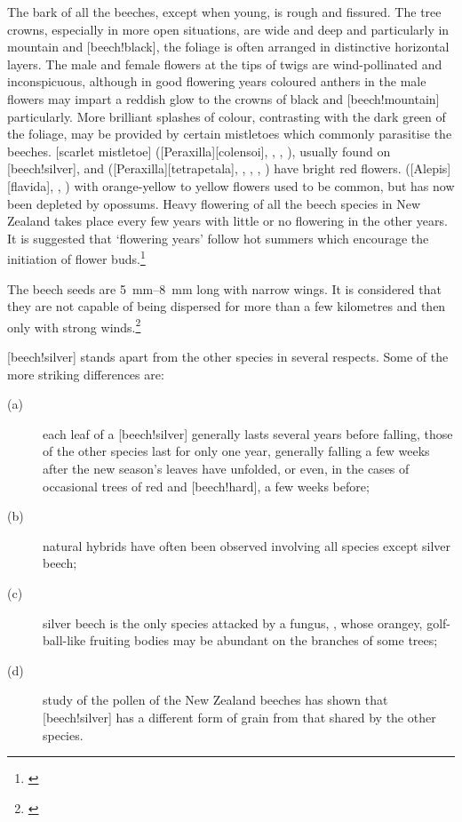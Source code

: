 The bark of all the beeches, except when young, is rough and fissured.
The tree crowns, especially in more open situations, are wide and deep and particularly in mountain and [beech!black], the foliage is often arranged in distinctive horizontal layers.
The male and female flowers at the tips of twigs are wind-pollinated and inconspicuous, although in good flowering years coloured anthers in the male flowers may impart a reddish glow to the crowns of black and [beech!mountain] particularly.
More brilliant splashes of colour, contrasting with the dark green of the foliage, may be provided by certain mistletoes which commonly parasitise the beeches.
[scarlet mistletoe] ([Peraxilla][colensoi], , , ), usually found on [beech!silver], and  ([Peraxilla][tetrapetala], , , , ) have bright red flowers.
 ([Alepis][flavida], , ) with orange-yellow to yellow flowers used to be common, but has now been depleted by opossums.
Heavy flowering of all the beech species in New Zealand takes place every few years with little or no flowering in the other years.
It is suggested that `flowering years' follow hot summers which encourage the initiation of flower buds.\footnote{\cite{poole1948flowering}}

The beech seeds are \SIrange{5}{8}{\milli\metre} long with narrow wings.
It is considered that they are not capable of being dispersed for more than a few kilometres and then only with strong winds.\footnote{\cite{preest1963dispersal}}

[beech!silver] stands apart from the other species in several respects.
Some of the more striking differences are:

\begin{description}
	\item[{(a)}]each leaf of a [beech!silver] generally lasts several years before falling, those of the other species last for only one year, generally falling a few weeks after the new season's leaves have unfolded, or even, in the cases of occasional trees of red and [beech!hard], a few weeks before;
	\item[{(b)}]natural hybrids have often been observed involving all species except silver beech;
	\item[{(c)}]silver beech is the only species attacked by a fungus, , whose orangey, golf-ball-like fruiting bodies may be abundant on the branches of some trees;
	\item[{(d)}]study of the pollen of the New Zealand beeches has shown that [beech!silver] has a different form of grain from that shared by the other species.
\end{description}


